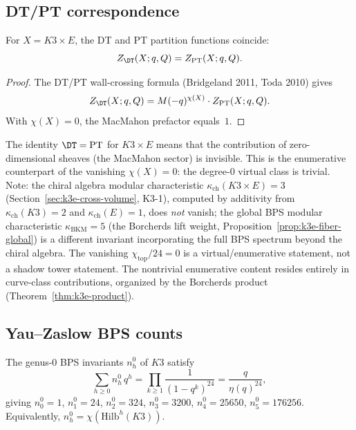 \subsection{DT/PT correspondence}
\label{subsec:k3e-dt-pt}

\begin{theorem}[DT/PT identity]
\label{thm:k3e-dt-pt}
For $X = K3 \times E$, the DT and PT partition functions coincide:
\[
 Z_{\DT}(X; q, Q) = Z_{\mathrm{PT}}(X; q, Q).
\]
\ClaimStatusProvedElsewhere
\end{theorem}

\begin{proof}
The DT/PT wall-crossing formula (Bridgeland 2011, Toda 2010) gives
\[
 Z_{\DT}(X; q, Q) = M(-q)^{\chi(X)} \cdot Z_{\mathrm{PT}}(X; q, Q).
\]
With $\chi(X) = 0$, the MacMahon prefactor equals~$1$.
\end{proof}

\begin{remark}[Structural content of $\chi = 0$]
\label{rem:k3e-chi-zero-structure}
The identity $\DT = \mathrm{PT}$ for $K3 \times E$ means that the contribution of zero-dimensional sheaves (the MacMahon sector) is invisible. This is the enumerative counterpart of the vanishing $\chi(X) = 0$: the degree-$0$ virtual class is trivial. Note: the chiral algebra modular characteristic $\kappa_{\mathrm{ch}}(K3 \times E) = 3$ (Section~\ref{sec:k3e-cross-volume}, K3-1), computed by additivity from $\kappa_{\mathrm{ch}}(K3) = 2$ and $\kappa_{\mathrm{ch}}(E) = 1$, does \emph{not} vanish; the global BPS modular characteristic $\kappa_{\mathrm{BKM}} = 5$ (the Borcherds lift weight, Proposition~\ref{prop:k3e-fiber-global}) is a different invariant incorporating the full BPS spectrum beyond the chiral algebra. The vanishing $\chi_{\mathrm{top}}/24 = 0$ is a virtual/enumerative statement, not a shadow tower statement. The nontrivial enumerative content resides entirely in curve-class contributions, organized by the Borcherds product (Theorem~\ref{thm:k3e-product}).
\end{remark}

\subsection{Yau--Zaslow BPS counts}
\label{subsec:k3e-yau-zaslow}

\begin{theorem}
\label{thm:k3e-yau-zaslow}
\ClaimStatusProvedElsewhere
The genus-$0$ BPS invariants $n_h^0$ of $K3$ satisfy
\[
 \sum_{h \geq 0} n_h^0 \, q^h = \prod_{k \geq 1} \frac{1}{(1 - q^k)^{24}} = \frac{q}{\eta(q)^{24}},
\]
giving $n_0^0 = 1$, $n_1^0 = 24$, $n_2^0 = 324$, $n_3^0 = 3200$, $n_4^0 = 25650$, $n_5^0 = 176256$. Equivalently, $n_h^0 = \chi(\mathrm{Hilb}^h(K3))$.
\ClaimStatusProvedElsewhere
\end{theorem}

